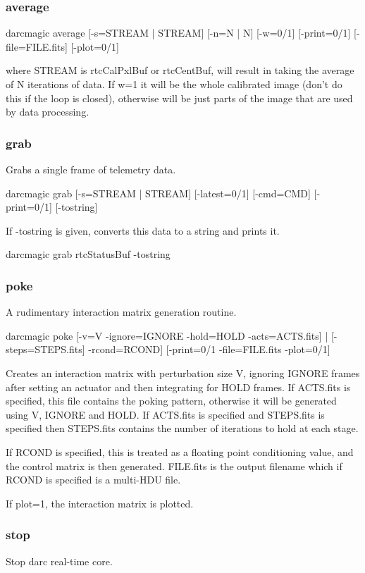 \documentclass[a4,10pt]{article}
\begin{document}
\subsubsection{average}
darcmagic average [-s=STREAM | STREAM] [-n=N | N] [-w=0/1]
[-print=0/1] [-file=FILE.fits] [-plot=0/1]

where STREAM is rtcCalPxlBuf or rtcCentBuf, will result in taking the
average of N iterations of data.  If w=1 it will be the whole
calibrated image (don't do this if the loop is closed), otherwise will
be just parts of the image that are used by data processing.

\subsubsection{grab}
Grabs a single frame of telemetry data.

darcmagic grab [-s=STREAM | STREAM] [-latest=0/1] [-cmd=CMD]
[-print=0/1] [-tostring]

If -tostring is given, converts this data to a string and prints it.

darcmagic grab rtcStatusBuf -tostring

\subsubsection{poke}
A rudimentary interaction matrix generation routine.

darcmagic poke [-v=V -ignore=IGNORE -hold=HOLD -acts=ACTS.fits] |
[-steps=STEPS.fits]  -rcond=RCOND] [-print=0/1 -file=FILE.fits -plot=0/1]

Creates an interaction matrix with perturbation size V, ignoring
IGNORE frames after setting an actuator and then integrating for HOLD
frames.  If ACTS.fits is specified, this file contains the poking
pattern, otherwise it will be generated using V, IGNORE and HOLD.  If
ACTS.fits is specified and STEPS.fits is specified then STEPS.fits
contains the number of iterations to hold at each stage.

If RCOND is specified, this is treated as a floating point
conditioning value, and the control matrix is then generated.
FILE.fits is the output filename which if RCOND is specified is a
multi-HDU file.

If plot=1, the interaction matrix is plotted.

\subsubsection{stop}
Stop darc real-time core.
\end{document}
